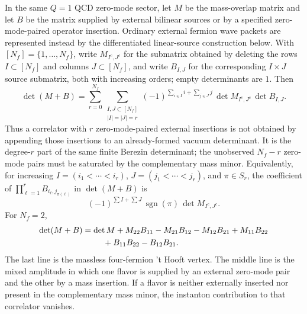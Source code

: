 \begin{proposition}
\label{prop:instanton-mass-source-minor-expansion}
In the same \(Q=1\) QCD zero-mode sector, let \(M\) be the mass-overlap
matrix and let \(B\) be the matrix supplied by external bilinear sources or
by a specified zero-mode-paired operator insertion.  Ordinary external fermion
wave packets are represented instead by the differentiated linear-source
construction below.  With
\([N_f]=\{1,\ldots,N_f\}\), write \(M_{I^c,J^c}\) for the submatrix obtained
by deleting the rows \(I\subset [N_f]\) and columns \(J\subset [N_f]\), and
write \(B_{I,J}\) for the corresponding \(I\times J\) source submatrix, both
with increasing orders; empty determinants are \(1\).  Then
\begin{equation}
  \det(M+B)
  =
  \sum_{r=0}^{N_f}
  \sum_{\substack{I,J\subset [N_f]\\ |I|=|J|=r}}
  (-1)^{\sum_{i\in I}i+\sum_{j\in J}j}\,
  \det M_{I^c,J^c}\,
  \det B_{I,J}.
  \label{eq:instanton-mass-source-minor-expansion}
\end{equation}
Thus a correlator with \(r\) zero-mode-paired external insertions is not
obtained by appending those insertions to an already-formed vacuum
determinant.  It is the degree-\(r\) part of the same finite Berezin
determinant; the unobserved \(N_f-r\) zero-mode pairs must be saturated by the
complementary mass minor.  Equivalently, for increasing
\(I=(i_1<\cdots<i_r)\), \(J=(j_1<\cdots<j_r)\), and
\(\pi\in S_r\), the coefficient of
\(\prod_{\ell=1}^r B_{i_\ell,j_{\pi(\ell)}}\) in \(\det(M+B)\) is
\begin{equation}
  (-1)^{\sum I+\sum J}\,
  \operatorname{sgn}(\pi)\,
  \det M_{I^c,J^c}.
  \label{eq:instanton-source-differentiation-minor}
\end{equation}
For \(N_f=2\),
\begin{equation}
\begin{aligned}
  \det(M+B)
  &=
  \det M
  +M_{22}B_{11}-M_{21}B_{12}
  -M_{12}B_{21}+M_{11}B_{22}  \\
  &\hspace{2.5em}
  +B_{11}B_{22}-B_{12}B_{21}.
\end{aligned}
  \label{eq:instanton-two-flavor-mass-source-expansion}
\end{equation}
The last line is the massless four-fermion 't Hooft vertex.  The middle line
is the mixed amplitude in which one flavor is supplied by an external
zero-mode pair and the other by a mass insertion.  If a flavor is neither
externally inserted nor present in the complementary mass minor, the
instanton contribution to that correlator vanishes.
\end{proposition}

